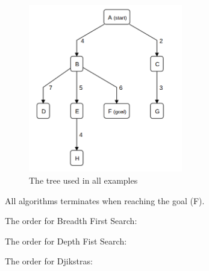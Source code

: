 \documentclass[12pt,a4paper]{article}
\begin{document}
\begin{figure}[ht]
	\centering
	\includegraphics[width=0.6\textwidth]{graph}
	\caption{The tree used in all examples}
\end{figure}

All algorithms terminates when reaching the goal (F).

The order for Breadth First Search: \\
\begin{table}[H]
	\caption{Breadth First Search}
\end{table}

The order for Depth Fist Search: \\
\begin{table}[H]
	\caption{Depth First Search}
\end{table}

The order for Djikstras: \\
\begin{table}[H]
	\caption{Djikstra's algorithm}
\end{table}
\end{document}

